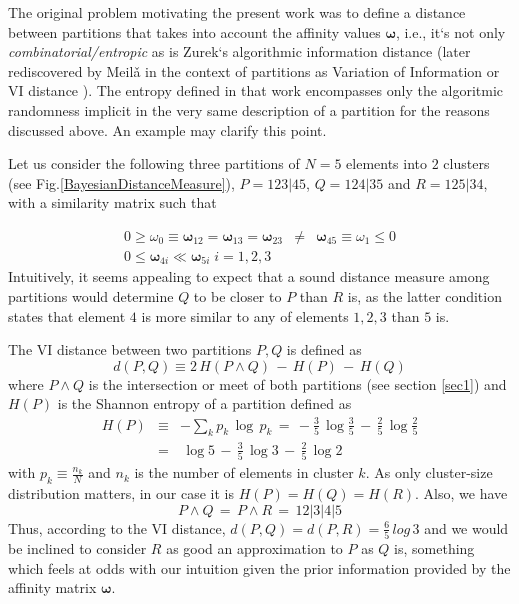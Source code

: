 \documentclass[twocolumn,aps,sort,nofootinbib]{revtex4}
\begin{document}
The original problem motivating the present work was 
to define a distance between partitions that 
takes into account the affinity %
values $\boldsymbol\omega$, 
i.e., it`s not only 
{\sl combinatorial/entropic} as is Zurek`s algorithmic information distance \cite{Zurek89-1} 
(later rediscovered by Meil{\v a} in the context of partitions as 
Variation of Information or VI distance \cite{MMeila03}).
The entropy defined in that work encompasses only the 
algoritmic randomness implicit in the very same description of
a partition for the reasons discussed above. 
An example may clarify this point.

Let us consider the following three partitions of \(N=5\) elements 
into $2$ clusters (see Fig.\ref{BayesianDistanceMeasure}),
\(P =  123|45\), \(Q = 124|35\) and \(R = 125|34\),  with a similarity matrix such that

\begin{subequations}
\begin{eqnarray}
0\geq\omega_0\equiv\boldsymbol{\omega}_{12} = \boldsymbol{\omega}_{13} = 
\boldsymbol{\omega}_{23} &\neq& \boldsymbol{\omega}_{45}\equiv\omega_1\leq0 \\
0\leq\boldsymbol\omega_{4i}\ll\boldsymbol\omega_{5i} \; i=1,2,3
\end{eqnarray}
\end{subequations}
Intuitively, it seems appealing to expect that a sound distance measure among 
partitions would determine \(Q\) to be closer to \(P\) than \(R\) is, as the 
latter condition states that element \(4\) is more similar to any of elements
\({1,2,3}\) than \(5\) is.

The VI distance between two partitions \(P,Q\) is defined as \cite{Zurek89-1,MMeila03}
\begin{equation}
d(P,Q)\equiv 2\,H(P\wedge Q)\,-\,H(P)\,-\,H(Q)
\end{equation}
where \(P\wedge Q\) is the intersection or meet of both partitions 
(see section \ref{sec1})
and \(H(P)\) is 
the Shannon entropy of a partition defined as
\begin{eqnarray*}
H(P)&\equiv& -\sum_k p_k\,\log\,p_k \,=\, -\frac{3}{5}\,\log\frac{3}{5}\,-\,\frac{2}{5}\,\log\frac{2}{5}\\
  \,&=&\,\log5\,-\,\frac{3}{5}\,\log3\,-\,\frac{2}{5}\,\log2
\end{eqnarray*}
with \(p_k\equiv \frac{n_k}{N}\) and \(n_k\) is the number of elements in cluster \(k\). 
As only cluster-size distribution matters, in our case it is \(H(P)=H(Q)=H(R)\). Also, we have
\begin{equation}
P\wedge Q \,=\, P\wedge R \,=\, 12|3|4|5   
\end{equation}
Thus, according to the VI distance, \(d(P,Q)=d(P,R)=\frac{6}{5}\,log\,3\) 
and we would be inclined to consider \(R\) as good an approximation 
to \(P\) as \(Q\) is, something which feels at odds with our intuition given 
the prior information provided by the affinity matrix \(\boldsymbol{\omega}\).
\end{document}
